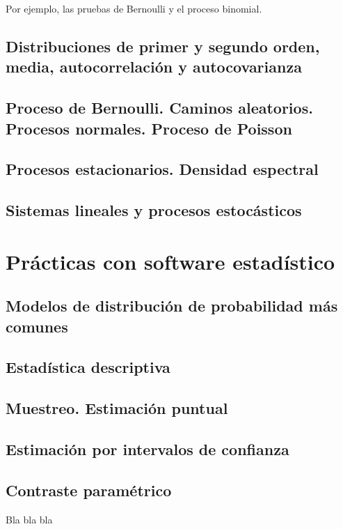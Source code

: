 \documentclass[a4paper]{book}
\begin{document}
Por ejemplo, las pruebas de Bernoulli y el proceso binomial.



\section{Distribuciones de primer y segundo orden, media, autocorrelación y autocovarianza}

\section{Proceso de Bernoulli. Caminos aleatorios. Procesos normales. Proceso de Poisson}

\section{Procesos estacionarios. Densidad espectral}

\section{Sistemas lineales y procesos estocásticos}

\chapter{Prácticas con software estadístico}


\section{Modelos de distribución de probabilidad más comunes}

\section{Estadística descriptiva}

\section{Muestreo. Estimación puntual}

\section{Estimación por intervalos de confianza}

\section{Contraste paramétrico}
Bla bla bla



%
%
\end{document}
